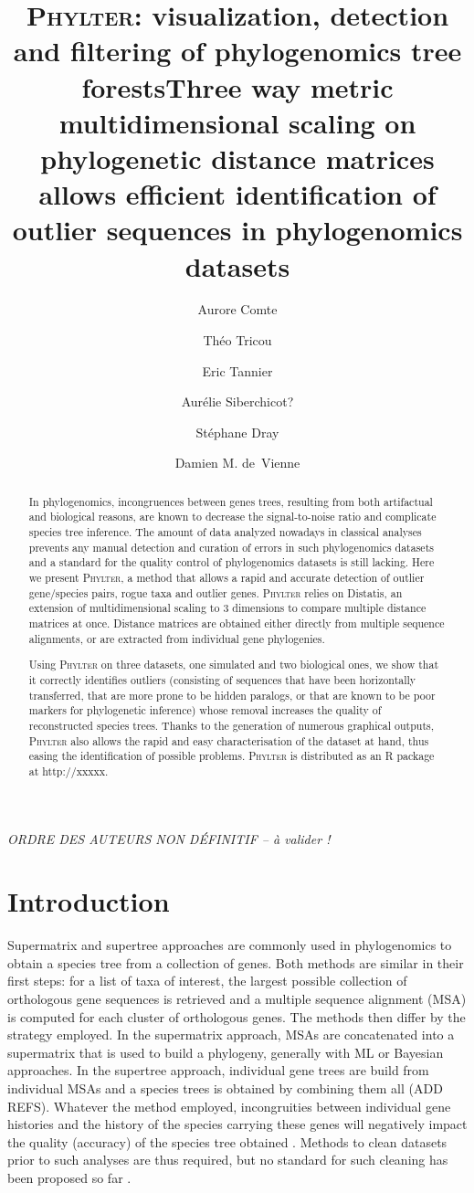 \documentclass{article}
\title{\textsc{Phylter}: visualization, detection and filtering of phylogenomics tree forests}
\title{Three way metric multidimensional scaling on phylogenetic distance matrices allows efficient identification of outlier sequences in phylogenomics datasets}
\author[1]{Aurore Comte}
\author[1]{Théo Tricou}
\author[1]{Eric Tannier}
\author[1]{Aurélie Siberchicot?}
\author[1]{Stéphane Dray}
\author[1,*]{Damien M. de~Vienne}
\affil[1]{Univ Lyon, Université Lyon 1, CNRS, Laboratoire de Biométrie et Biologie Évolutive
UMR5558, F-69622 Villeurbanne, France}
\affil[*]{Corresponding author: damien.de-vienne@univ-lyon1.fr}
\date{}
\begin{document}
\maketitle

\doublespacing
\linenumbers
\textit{ORDRE DES AUTEURS NON DÉFINITIF -- à valider !}
\begin{abstract}
In phylogenomics, incongruences between genes trees, resulting from both artifactual and biological reasons, are known to decrease the signal-to-noise ratio and complicate species tree inference. The amount of data analyzed nowadays in classical analyses prevents any manual detection and curation of errors in such phylogenomics datasets and a standard for the quality control of phylogenomics datasets is still lacking. 
Here we present \textsc{Phylter}, a method that allows a rapid and accurate detection of outlier gene/species pairs, rogue taxa and outlier genes. \textsc{Phylter} relies on Distatis, an extension of multidimensional scaling to 3 dimensions to compare multiple distance matrices at once. Distance matrices are obtained either directly from multiple sequence alignments, or are extracted from individual gene phylogenies. 

Using \textsc{Phylter} on three datasets, one simulated and two biological ones, we show that it correctly identifies outliers (consisting of sequences that have been horizontally transferred, that are more prone to be hidden paralogs, or that are known to be poor markers for phylogenetic inference) whose removal increases the quality of reconstructed species trees. Thanks to the generation of numerous graphical outputs, \textsc{Phylter} also allows the rapid and easy characterisation of the dataset at hand, thus easing the identification of possible problems. \textsc{Phylter} is distributed as an R package at http://xxxxx. 
\end{abstract}

\section{Introduction}

Supermatrix and supertree approaches are commonly used in phylogenomics to obtain a species tree from a collection of genes. Both methods are similar in their first steps: for a list of taxa of interest, the largest possible collection of orthologous gene sequences is retrieved and a multiple sequence alignment (MSA)  is computed for each cluster of orthologous genes. The methods then differ by the strategy employed. In the supermatrix approach, MSAs are concatenated into a supermatrix that is used to build a phylogeny, generally with ML or Bayesian approaches. In the supertree approach, individual gene trees are build from individual MSAs and a species trees is obtained by combining them all (ADD REFS). 
Whatever the method employed, incongruities between individual gene histories and the history of the species carrying these genes will negatively impact the quality (accuracy) of the species tree obtained \cite{philippe2017pitfalls}. Methods to clean datasets prior to such analyses are thus required, but no standard for such cleaning has been proposed so far \cite{philippe2017pitfalls}. 
\end{document}
